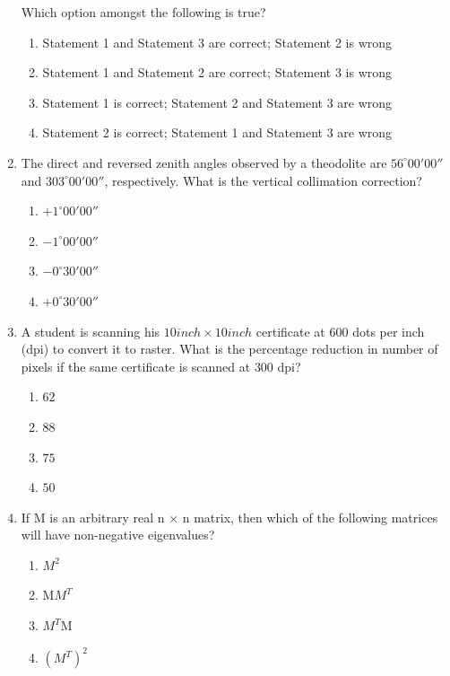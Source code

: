 \documentclass[journal,12pt,onecolumn]{IEEEtran}
\theoremstyle{remark}
\begin{document}
\begin{enumerate}
Which option amongst the following is true?

\hfill{}
\begin{enumerate}
\item Statement 1 and Statement 3 are correct; Statement 2 is wrong
\item Statement 1 and Statement 2 are correct; Statement 3 is wrong
\item Statement 1 is correct; Statement 2 and Statement 3 are wrong
\item Statement 2 is correct; Statement 1 and Statement 3 are wrong
\end{enumerate}

\item The direct and reversed zenith angles observed by a theodolite are $56^\circ 00' 00''$ and $303^\circ 00' 00''$, respectively. What is the vertical collimation correction?

\hfill{}
\begin{enumerate}
\item $+1^\circ 00' 00''$
\item $-1^\circ 00' 00''$
\item $-0^\circ 30' 00''$
\item $+0^\circ 30' 00''$
\end{enumerate}

\item A student is scanning his $10 inch\times10 inch$ certificate at $600$ dots per inch (dpi) to convert it to raster. What is the percentage reduction in number of pixels if the same certificate is scanned at $300$ dpi?

\hfill{}
\begin{enumerate}
\item $62$
\item $88$
\item $75$
\item $50$
\end{enumerate}

\item If M is an arbitrary real n × n matrix, then which of the following matrices will have non-negative eigenvalues?

\hfill{}
\begin{enumerate}
\item $M^2$
\item M$M^T$
\item $M^T$M
\item $(M^T)^2$
\end{enumerate}


\end{enumerate}
\end{document}
